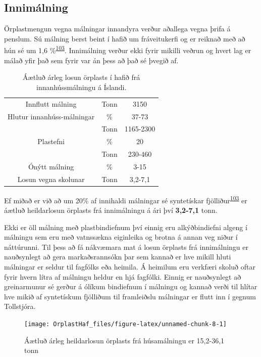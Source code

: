 \documentclass[icelandic,]{book}
\begin{document}
\hypertarget{innimalning}{%
\subsection*{Innimálning}\label{innimalning}}

Örplastmengun vegna málningar innandyra verður aðallega vegna þrifa á penslum. Sú málning berst beint í hafið um fráveitukerfi og er reiknað með að hún sé um 1,6 \%\textsuperscript{\protect\hyperlink{ref-Hann2018}{103}}. Innimálning verður ekki fyrir mikilli veðrun og hvert lag er málað yfir það sem fyrir var án þess að það sé þvegið af.

\begin{table}[t]

\caption{\label{tab:innimalningartafla}Áætluð árleg losun örplasts í hafið frá innanhússmálningu á Íslandi.}
\centering
\begin{tabular}{ccc}
\toprule
Innflutt málning & Tonn & 3150\\
Hlutur innanhúss-málningar & \% & 37-73\\
 & Tonn & 1165-2300\\
Plastefni & \% & 20\\
 & Tonn & 230-460\\
\addlinespace
Ónýtt málning & \% & 3-15\\
Losun vegna skolunar & Tonn & 3,2-7,1\\
\bottomrule
\end{tabular}
\end{table}

Ef miðað er við að um 20\% af innihaldi málningar sé syntetískar fjölliður\textsuperscript{\protect\hyperlink{ref-Hann2018}{103}} er áætluð heildarlosun örplasts frá innimálningu á ári því \textbf{3,2-7,1} tonn.

Ekki er öll málning með plastbindiefnum því einnig eru alkýðbindiefni algeng í málningu sem eru með vatnssækna eiginleika og brotna á annan veg niður í náttúrunni. Til þess að fá nákvæmara mat á losun örplasts frá innimálningu er nauðsynlegt að gera markaðsrannsókn þar sem kannað er hve mikill hluti málningar er seldur til fagfólks eða heimila. Á heimilum eru verkfæri skoluð oftar fyrir hvern lítra af málningu heldur en hjá fagfólki. Einnig er nauðsynlegt að greinarmunur sé gerður á ólíkum bindiefnum í málningu og kannað verði til hlítar hve mikið af syntetískum fjölliðum til framleiðslu málningar er flutt inn í gegnum Tollstjóra.

\begin{figure}

{\centering \texttt{[image: OrplastHaf\_files/figure-latex/unnamed-chunk-8-1]} 

}

\caption{Áætluð árleg heildarlosun örplasts frá húsamálningu er 15,2-36,1 tonn}\label{fig:unnamed-chunk-8}
\end{figure}
\end{document}
